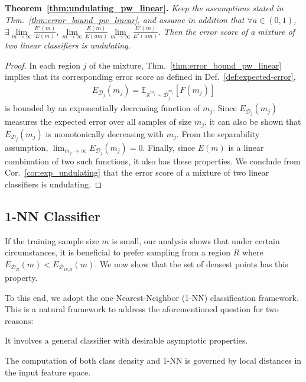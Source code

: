 \documentclass{article}
\newcommand{\E}{\mathbb{E}}
\newcommand{\iX}{\mathbb{X}}
\newcommand{\Dd}{\mathcal{D}}
\newcommand{\ahard}{a}
\begin{document}
\noindent
\textbf{Theorem~\ref{thm:undulating_pw_linear}.} \textit{
Keep the assumptions stated in Thm.~\ref{thm:error_bound_pw_linear}, and assume in addition that $\forall\ahard\!\in\! (0,1)$, $\exists\lim\limits_{m\to\infty}\frac{E'(m)}{E(m)}, \lim\limits_{m\rightarrow\infty}\frac{E(m)}{E(\ahard m)} \lim\limits_{m\rightarrow\infty}\frac{E'(m)}{E'(\ahard m)}$. 
Then the error score of a mixture of two linear classifiers is undulating. 
}
\begin{proof}
In each region $j$ of the mixture, Thm.~\ref{thm:error_bound_pw_linear} implies that its corresponding error score as defined in Def.~\ref{def:expected-error},
\begin{eqnarray*}
E_{\Dd_j}(m_j) = \E_{\iX^{m_j}\sim\Dd_j^{m_j}}\left[F(m_j)\right]
\end{eqnarray*}
is bounded by an exponentially decreasing function of $m_j$. Since $E_{\Dd_j}(m_j)$ measures the expected error over all samples of size $m_j$, it can also be shown that $E_{\Dd_j}(m_j)$ is monotonically decreasing with $m_j$. From the separability assumption, $\lim_{m_j\rightarrow\infty}E_{\Dd_j}(m_j)=0$. Finally, since $E(m)$ is a linear combination of two such functions, it also has these properties. We conclude from Cor.~\ref{cor:exp_undulating} that the error score of a mixture of two linear classifiers is undulating.
\end{proof}







\subsection{1-NN Classifier}
\label{app:sec:1_nn_classifier_full_sec}
If the training sample size $m$ is small, our analysis shows that under certain circumstances, it is beneficial to prefer sampling from a region $R$ where $E_{\Dd_{R}}(m)<E_{\Dd_{\Omega \setminus R}}(m)$. We now show that the set of densest points  has this property.

To this end, we adopt the one-Nearest-Neighbor (1-NN) classification framework. This is a natural framework to address the aforementioned question for two reasons: \begin{inparaenum}[(i)] \item  It involves a general classifier with desirable asymptotic properties.
\item The computation of both class density and 1-NN is governed by local distances in the input feature space.\end{inparaenum} 
\end{document}
